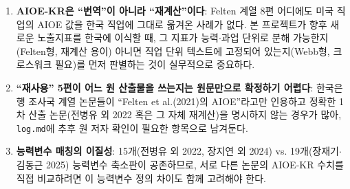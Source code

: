 \documentclass[11pt]{article}
\begin{document}
\begin{enumerate}[label=\arabic*.]
  \item \textbf{AIOE-KR은 ``번역''이 아니라 ``재계산''이다}: Felten 계열 8편 어디에도 미국 직업의 AIOE 값을 한국 직업에 그대로 옮겨온 사례가 없다. 본 프로젝트가 향후 새로운 노출지표를 한국에 이식할 때, 그 지표가 능력$\cdot$과업 단위로 분해 가능한지(Felten형, 재계산 용이) 아니면 직업 단위 텍스트에 고정되어 있는지(Webb형, 크로스워크 필요)를 먼저 판별하는 것이 실무적으로 중요하다.
  \item \textbf{``재사용'' 5편이 어느 원 산출물을 쓰는지는 원문만으로 확정하기 어렵다}: 한국은행 조사국 계열 논문들이 ``Felten et al.(2021)의 AIOE''라고만 인용하고 정확한 1차 산출 논문(전병유 외 2022 혹은 그 자체 재계산)을 명시하지 않는 경우가 많아, \texttt{log.md}에 추후 원 저자 확인이 필요한 항목으로 남겨둔다.
  \item \textbf{능력변수 매칭의 이질성}: 15개(전병유 외 2022, 장지연 외 2024) vs. 19개(장재기$\cdot$김동근 2025) 능력변수 축소판이 공존하므로, 서로 다른 논문의 AIOE-KR 수치를 직접 비교하려면 이 능력변수 정의 차이도 함께 고려해야 한다.
\end{enumerate}

\printbibliography
\end{document}
